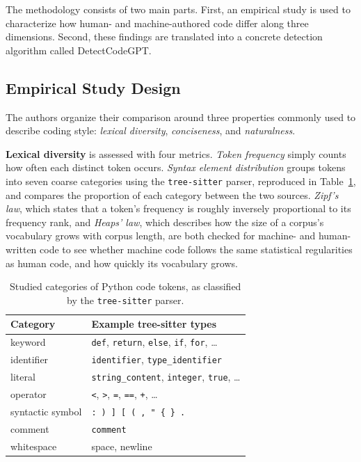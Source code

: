 \documentclass[manuscript,review]{acmart}
\begin{document}
The methodology consists of two main parts. First, an empirical study is used to characterize how human- and machine-authored code differ along three dimensions. Second, these findings are translated into a concrete detection algorithm called DetectCodeGPT.

\subsection{Empirical Study Design}
\label{sec:study-design}
The authors organize their comparison around three properties commonly used to describe coding style: \emph{lexical diversity}, \emph{conciseness}, and \emph{naturalness}.

\textbf{Lexical diversity} is assessed with four metrics. \emph{Token frequency} simply counts how often each distinct token occurs. \emph{Syntax element distribution} groups tokens into seven coarse categories using the \texttt{tree-sitter} parser, reproduced in Table~\ref{tab:categories}, and compares the proportion of each category between the two sources. \emph{Zipf's law}, which states that a token's frequency is roughly inversely proportional to its frequency rank, and \emph{Heaps' law}, which describes how the size of a corpus's vocabulary grows with corpus length, are both checked for machine- and human-written code to see whether machine code follows the same statistical regularities as human code, and how quickly its vocabulary grows.

\begin{table}[t]
\caption{Studied categories of Python code tokens, as classified by the \texttt{tree-sitter} parser.}
\label{tab:categories}
\begin{tabular}{@{}ll@{}}
\toprule
\textbf{Category} & \textbf{Example tree-sitter types} \\
\midrule
keyword          & \texttt{def}, \texttt{return}, \texttt{else}, \texttt{if}, \texttt{for}, \ldots \\
identifier       & \texttt{identifier}, \texttt{type\_identifier} \\
literal          & \texttt{string\_content}, \texttt{integer}, \texttt{true}, \ldots \\
operator         & \texttt{<}, \texttt{>}, \texttt{=}, \texttt{==}, \texttt{+}, \ldots \\
syntactic symbol & \texttt{:}\, \texttt{)}\, \texttt{]}\, \texttt{[}\, \texttt{(}\, \texttt{,}\, \texttt{"}\, \texttt{\{}\, \texttt{\}}\, \texttt{.} \\
comment          & \texttt{comment} \\
whitespace       & space, newline \\
\bottomrule
\end{tabular}
\end{table}
\end{document}
